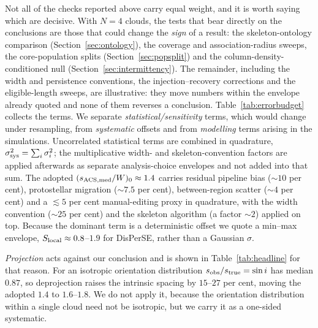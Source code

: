 \documentclass[usenatbib,twoside,twocolumn]{mnras}
\begin{document}
Not all of the checks reported above carry equal weight, and it is worth saying which are decisive. With $N=4$ clouds, the tests that bear directly on the conclusions are those that could change the \emph{sign} of a result: the skeleton-ontology comparison (Section~\ref{sec:ontology}), the coverage and association-radius sweeps, the core-population splits (Section~\ref{sec:popsplit}) and the column-density-conditioned null (Section~\ref{sec:intermittency}). The remainder, including the width and persistence conventions, the injection--recovery corrections and the eligible-length sweeps, are illustrative: they move numbers within the envelope already quoted and none of them reverses a conclusion. Table~\ref{tab:errorbudget} collects the terms. We separate \emph{statistical/sensitivity} terms, which would change under resampling, from \emph{systematic} offsets and from \emph{modelling} terms arising in the simulations. Uncorrelated statistical terms are combined in quadrature, $\sigma_{\rm sys}^2=\sum_i\sigma_i^2$; the multiplicative width- and skeleton-convention factors are applied afterwards as separate analysis-choice envelopes  and not added into that sum. The adopted $(s_{\rm ACS,med}/W)_0\approx1.4$ carries residual pipeline bias ($\sim10$ per cent), protostellar migration ($\sim7.5$ per cent), between-region scatter ($\sim4$ per cent) and a $\lesssim5$ per cent manual-editing proxy in quadrature, with the width convention ($\sim25$ per cent) and the skeleton algorithm (a factor $\sim2$) applied on top. Because the dominant term is a deterministic offset we quote a min--max envelope, $S_{\rm local}\approx0.8$--$1.9$ for DisPerSE, rather than a Gaussian $\sigma$.

\emph{Projection} acts against our conclusion and is shown in Table~\ref{tab:headline} for that reason. For an isotropic orientation distribution $s_{\rm obs}/s_{\rm true}=\sin i$ has median $0.87$, so deprojection raises the intrinsic spacing by $15$--$27$ per cent, moving the adopted $1.4$ to $1.6$--$1.8$. We do not apply it, because the orientation distribution within a single cloud need not be isotropic, but we carry it as a one-sided systematic.
\end{document}
